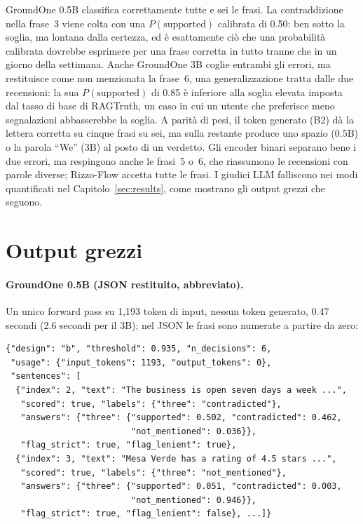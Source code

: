 GroundOne 0.5B classifica correttamente tutte e sei le frasi. La contraddizione nella frase~3 viene colta con una
$P(\text{supported})$ calibrata di 0.50: ben sotto la soglia, ma lontana dalla certezza, ed è esattamente ciò che una
probabilità calibrata dovrebbe esprimere per una frase corretta in tutto tranne che in un giorno della settimana. Anche
GroundOne 3B coglie entrambi gli errori, ma restituisce come non menzionata la frase~6, una generalizzazione tratta dalle
due recensioni: la sua $P(\text{supported})$ di 0.85 è inferiore alla soglia elevata imposta dal tasso di base di
RAGTruth, un caso in cui un utente che preferisce meno segnalazioni abbasserebbe la soglia. A parità di pesi, il token
generato (B2) dà la lettera corretta su cinque frasi su sei, ma sulla restante produce uno spazio (0.5B) o la parola
``We'' (3B) al posto di un verdetto. Gli encoder binari separano bene i due errori, ma respingono anche le frasi~5 o~6,
che riassumono le recensioni con parole diverse; Rizzo-Flow accetta tutte le frasi. I giudici LLM falliscono nei
modi quantificati nel Capitolo~\ref{sec:results}, come mostrano gli output grezzi che seguono.

\section{Output grezzi}

\paragraph{GroundOne 0.5B (JSON restituito, abbreviato).} Un unico forward pass su 1{,}193 token di input, nessun token
generato, 0.47 secondi (2.6 secondi per il 3B); nel JSON le frasi sono numerate a partire da zero:
{\footnotesize
\begin{verbatim}
{"design": "b", "threshold": 0.935, "n_decisions": 6,
 "usage": {"input_tokens": 1193, "output_tokens": 0},
 "sentences": [
  {"index": 2, "text": "The business is open seven days a week ...",
   "scored": true, "labels": {"three": "contradicted"},
   "answers": {"three": {"supported": 0.502, "contradicted": 0.462,
                         "not_mentioned": 0.036}},
   "flag_strict": true, "flag_lenient": true},
  {"index": 3, "text": "Mesa Verde has a rating of 4.5 stars ...",
   "scored": true, "labels": {"three": "not_mentioned"},
   "answers": {"three": {"supported": 0.051, "contradicted": 0.003,
                         "not_mentioned": 0.946}},
   "flag_strict": true, "flag_lenient": false}, ...]}
\end{verbatim}
}

